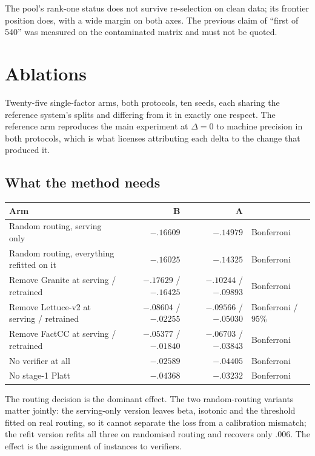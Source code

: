 \documentclass[10pt,a4paper]{article}
\newcommand{\fix}[1]{\textcolor{red!65!black}{#1}}
\begin{document}
The pool's rank-one status does not survive re-selection on clean data; its frontier position
does, with a wide margin on both axes. \fix{The previous claim of ``first of 540'' was measured on
the contaminated matrix and must not be quoted.}

\section{Ablations}
\label{sec:abl}

Twenty-five single-factor arms, both protocols, ten seeds, each sharing the reference system's
splits and differing from it in exactly one respect. The reference arm reproduces the main
experiment at $\Delta=0$ to machine precision in both protocols, which is what licenses
attributing each delta to the change that produced it.

\subsection{What the method needs}

\begin{center}\small
\begin{tabular}{lrrl}
\toprule
Arm & B & A & \\
\midrule
Random routing, serving only & $-.16609$ & $-.14979$ & Bonferroni \\
Random routing, everything refitted on it & $-.16025$ & $-.14325$ & Bonferroni \\
Remove Granite at serving / retrained & $-.17629$ / $-.16425$ & $-.10244$ / $-.09893$ & Bonferroni \\
Remove Lettuce-v2 at serving / retrained & $-.08604$ / $-.02255$ & $-.09566$ / $-.05030$ & Bonferroni / 95\% \\
Remove FactCC at serving / retrained & $-.05377$ / $-.01840$ & $-.06703$ / $-.03843$ & Bonferroni \\
No verifier at all & $-.02589$ & $-.04405$ & Bonferroni \\
No stage-1 Platt & $-.04368$ & $-.03232$ & Bonferroni \\
\bottomrule
\end{tabular}
\end{center}

The routing decision is the dominant effect. The two random-routing variants matter jointly:
the serving-only version leaves beta, isotonic and the threshold fitted on real routing, so it
cannot separate the loss from a calibration mismatch; the refit version refits all three on
randomised routing and recovers only $.006$. The effect is the assignment of instances to
verifiers.
\end{document}
